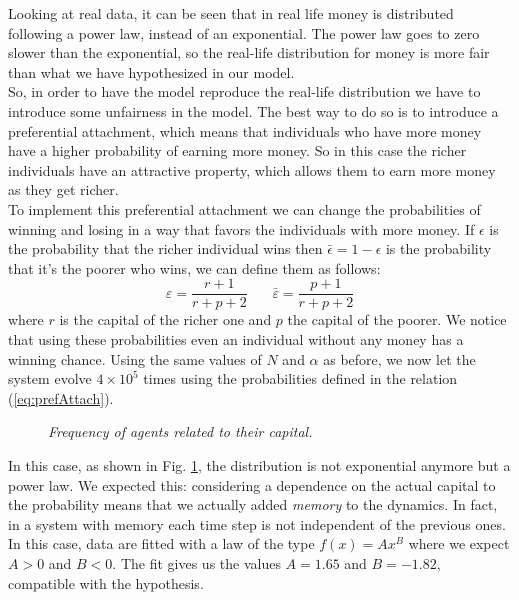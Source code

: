 Looking at real data, it can be seen that in real life money is distributed following a power law, instead of an exponential.
The power law goes to zero slower than the exponential, so the real-life distribution for money is more fair than what we have hypothesized in our model. \\
So, in order to have the model reproduce the real-life distribution we have to introduce some unfairness in the model.
The best way to do so is to introduce a preferential attachment, which means that individuals who have more money have a higher probability of earning more money.
So in this case the richer individuals have an attractive property, which allows them to earn more money as they get richer. \\
To implement this preferential attachment we can change the probabilities of winning and losing in a way that favors the individuals with more money.
If $\epsilon$ is the probability that the richer individual wins then $\bar{\epsilon} = 1 - \epsilon$ is the probability that it's the poorer who wins, we can define them as follows:
\begin{equation}
	\varepsilon = \frac{r + 1}{r + p + 2} \ \ \ \ \ \ \ \  \bar{\varepsilon} = \frac{p + 1}{r + p + 2}
	\label{eq:prefAttach}
\end{equation}
where $r$ is the capital of the richer one and $p$ the capital of the poorer.
We notice that using these probabilities even an individual without any money has a winning chance.
Using the same values of $N$ and $\alpha$ as before, we now let the system evolve $4 \times 10^5$ times using the probabilities defined in the relation (\ref{eq:prefAttach}).
\begin{figure}[ht!]
    \centering
    \scalebox{.7}{}
    \caption{\emph{Frequency of agents related to their capital.}}
    \label{fig:prefAttach}
\end{figure}
In this case, as shown in Fig. \ref{fig:prefAttach}, the distribution is not exponential anymore but a power law.
We expected this: considering a dependence on the actual capital to the probability means that we actually added \emph{memory} to the dynamics.
In fact, in a system with memory each time step is not independent of the previous ones.
In this case, data are fitted with a law of the type $f(x) = Ax^B$ where we expect $A > 0$ and $B < 0$.
The fit gives us the values $A = 1.65$ and $B = -1.82$, compatible with the hypothesis.

